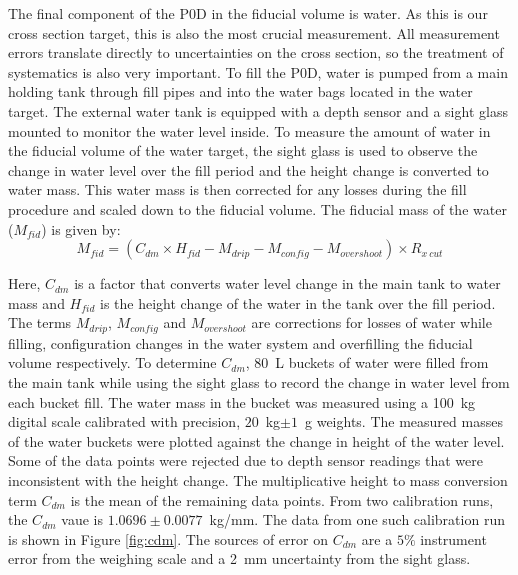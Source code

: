 The final component of the P0D in the fiducial volume is water. As this is our cross section target, this is also the most crucial measurement. All measurement errors translate directly to uncertainties on the cross section, so the treatment of systematics is also very important. To fill the P0D, water is pumped from a main holding tank through fill pipes and into the water bags located in the water target. The external water tank is equipped with a depth sensor and a sight glass mounted to monitor the water level inside. To measure the amount of water in the fiducial volume of the water target, the sight glass is used to observe the change in water level over the fill period and the height change is converted to water mass. This water mass is then corrected for any losses during the fill procedure and scaled down to the fiducial volume. The fiducial mass of the water ($M_{fid}$) is given by:
\begin{equation*}
M_{fid} = (C_{dm}\times H_{fid} - M_{drip} - M_{config} - M_{overshoot}) \times R_{x~cut}
\end{equation*}

Here, $C_{dm}$ is a factor that converts water level change in the main tank to water mass and $H_{fid}$ is the height change of the water in the tank over the fill period. The terms $M_{drip}$, $M_{config}$ and $M_{overshoot}$ are corrections for losses of water while filling, configuration changes in the water system and overfilling the fiducial volume respectively. To determine $C_{dm}$, 80~L buckets of water were filled from the main tank while using the sight glass to record the change in water level from each bucket fill. The water mass in the bucket was measured using a 100~kg digital scale calibrated with precision, $20$~kg$\pm 1$~g weights. The measured masses of the water buckets were plotted against the change in height of the water level. Some of the data points were rejected due to depth sensor readings that were inconsistent with the height change. The multiplicative height to mass conversion term $C_{dm}$ is the mean of the remaining data points. From two calibration runs, the $C_{dm}$ vaue is $1.0696 \pm 0.0077$~kg/mm. The data from one such calibration run is shown in Figure \ref{fig:cdm}. The sources of error on $C_{dm}$ are a $5\%$ instrument error from the weighing scale and a 2~mm uncertainty from the sight glass.

